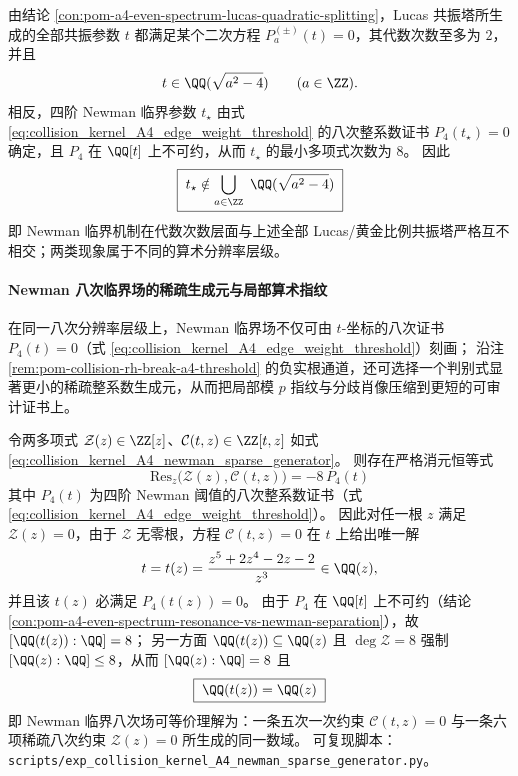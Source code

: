 \begin{conclusion}\label{con:pom-a4-even-spectrum-resonance-vs-newman-separation}
由结论 \ref{con:pom-a4-even-spectrum-lucas-quadratic-splitting}，Lucas 共振塔所生成的全部共振参数 \(t\) 都满足某个二次方程 \(P_a^{(\pm)}(t)=0\)，其代数次数至多为 \(2\)，并且
\[
t\in\QQ(\sqrt{a^2-4})
\qquad(a\in\ZZ).
\]
相反，四阶 Newman 临界参数 \(t_\star\) 由式 \eqref{eq:collision_kernel_A4_edge_weight_threshold} 的八次整系数证书 \(P_4(t_\star)=0\) 确定，且 \(P_4\) 在 \(\QQ[t]\) 上不可约，从而 \(t_\star\) 的最小多项式次数为 \(8\)。
因此
\[
\boxed{\;
t_\star\notin \bigcup_{a\in\ZZ}\ \QQ(\sqrt{a^2-4})\;}
\]
即 Newman 临界机制在代数次数层面与上述全部 Lucas/黄金比例共振塔严格互不相交；两类现象属于不同的算术分辨率层级。
\end{conclusion}
\paragraph{Newman 八次临界场的稀疏生成元与局部算术指纹}
在同一八次分辨率层级上，Newman 临界场不仅可由 \(t\)-坐标的八次证书 \(P_4(t)=0\)（式 \eqref{eq:collision_kernel_A4_edge_weight_threshold}）刻画；
沿注 \ref{rem:pom-collision-rh-break-a4-threshold} 的负实根通道，还可选择一个判别式显著更小的稀疏整系数生成元，从而把局部模 \(p\) 指纹与分歧肖像压缩到更短的可审计证书上。

\begin{conclusion}\label{con:pom-a4-newman-sparse-generator-elimination}
令两多项式 \(\mathcal Z(z)\in\ZZ[z]\)、\(\mathcal C(t,z)\in\ZZ[t,z]\) 如式 \eqref{eq:collision_kernel_A4_newman_sparse_generator}。
则存在严格消元恒等式
\[
\boxed{\;
\mathrm{Res}_z\!\bigl(\mathcal Z(z),\mathcal C(t,z)\bigr)=-8\,P_4(t)\;}
\]
其中 \(P_4(t)\) 为四阶 Newman 阈值的八次整系数证书（式 \eqref{eq:collision_kernel_A4_edge_weight_threshold}）。
因此对任一根 \(z\) 满足 \(\mathcal Z(z)=0\)，由于 \(\mathcal Z\) 无零根，方程 \(\mathcal C(t,z)=0\) 在 \(t\) 上给出唯一解
\[
t=t(z)=\frac{z^5+2z^4-2z-2}{z^3}\in\QQ(z),
\]
并且该 \(t(z)\) 必满足 \(P_4(t(z))=0\)。
由于 \(P_4\) 在 \(\QQ[t]\) 上不可约（结论 \ref{con:pom-a4-even-spectrum-resonance-vs-newman-separation}），故 \([\QQ(t(z)):\QQ]=8\)；
另一方面 \(\QQ(t(z))\subseteq \QQ(z)\) 且 \(\deg\mathcal Z=8\) 强制 \([\QQ(z):\QQ]\le 8\)，从而 \([\QQ(z):\QQ]=8\) 且
\[
\boxed{\;\QQ(t(z))=\QQ(z)\;}
\]
即 Newman 临界八次场可等价理解为：一条五次一次约束 \(\mathcal C(t,z)=0\) 与一条六项稀疏八次约束 \(\mathcal Z(z)=0\) 所生成的同一数域。
可复现脚本：\texttt{scripts/exp\_collision\_kernel\_A4\_newman\_sparse\_generator.py}。
\end{conclusion}

